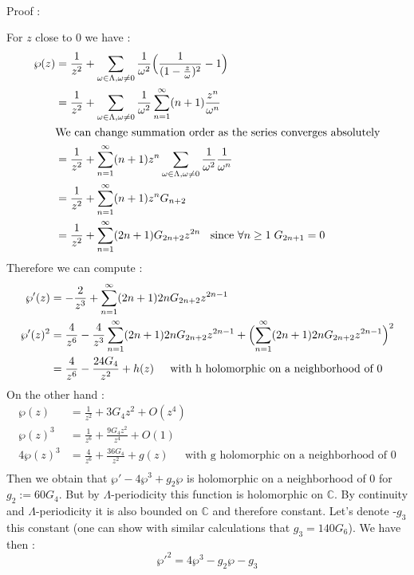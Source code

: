 \documentclass[letterpaper,10pt]{article}
\begin{document}
{\itshape \paragraph{} Proof :} For $z$ close to 0 we have : \begin{align*}
    \wp(z) &= \frac{1}{z^2} +  \sum_{\omega \in \Lambda , \omega \neq 0 }\frac{1}{\omega^2}  \Bigl(\frac{1}{(1 - \frac{z}{\omega})^2} - 1\Bigr) \\
     &=  \frac{1}{z^2} +  \sum_{\omega \in \Lambda , \omega \neq 0 }\frac{1}{\omega^2}  \sum_{n = 1}^\infty (n+1)\frac{z^n}{\omega^n}\\
     &\text{We can change summation order as the series converges absolutely}\\
     &=  \frac{1}{z^2} +  \sum_{n = 1}^\infty (n+1)z^n  \sum_{\omega \in \Lambda , \omega \neq 0 } \frac{1}{\omega^2}\frac{1}{\omega^n} \\
     &=  \frac{1}{z^2} +  \sum_{n = 1}^\infty (n+1)z^n G_{n+2}  \\
     &=  \frac{1}{z^2} +  \sum_{n = 1}^\infty (2n+1) G_{2n+2} z^{2n} \;\; \text{  since  } \forall n \geq 1 \; G_{2n+1} = 0  \\
\end{align*}
Therefore we can compute : \begin{align*}
  \wp'(z) &= -\frac{2}{z^3} + \sum_{n = 1}^\infty (2n+1)2n G_{2n+2} z^{2n-1} \\
  \wp'(z)^2 &= \frac{4}{z^6} - \frac{4}{z^3}\sum_{n = 1}^\infty (2n+1)2n G_{2n+2} z^{2n-1} + \Bigl(\sum_{n = 1}^\infty (2n+1)2n G_{2n+2} z^{2n-1}\Bigr)^2\\
  &= \frac{4}{z^6} - \frac{24G_4}{z^2} + h(z) \;\;\;\; \text{ with h holomorphic on a neighborhood of 0}
\end{align*} On the other hand :
\begin{align*}
  \wp(z) &= \frac{1}{z^2} + 3G_4z^2 + O(z^4) \\
  \wp(z)^3 &= \frac{1}{z^6} + \frac{9G_4z^2}{z^4} + O(1) \\
   4\wp(z)^3 &= \frac{4}{z^6} + \frac{36G_4}{z^2} + g(z)  \;\;\;\; \text{ with g holomorphic on a neighborhood of 0}\\
\end{align*} Then we obtain that $\wp' - 4\wp^3 + g_2\wp$ is holomorphic on a neighborhood of 0 for $g_2 := 60G_4$. But by $\Lambda$-periodicity this function is holomorphic on 
 $\mathbb{C}$. By continuity and $\Lambda$-periodicity it is also bounded on $\mathbb{C}$ and therefore constant.
 Let's denote -$g_3$ this constant (one can show with similar calculations that $g_3 = 140G_6$). We have then :
  \[ \wp'^2 = 4\wp^3 - g_2\wp - g_3  \]
\end{document}
